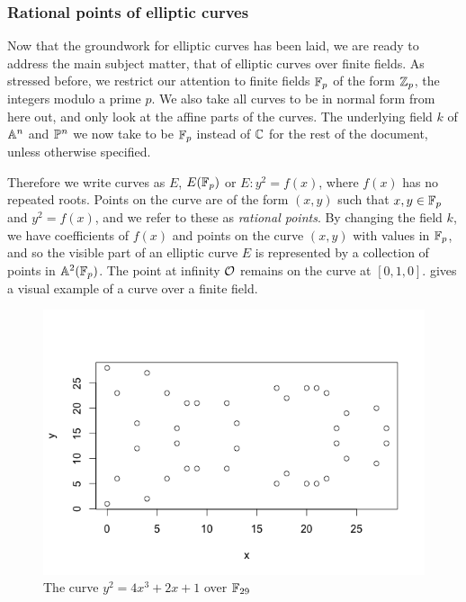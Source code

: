 \subsubsection{Rational points of elliptic curves}
Now that the groundwork for elliptic curves has been laid, we are ready to address the main subject matter, that of elliptic curves over finite fields.
As stressed before, we restrict our attention to finite fields $\fp$ of the form $\zn[p]$, the integers modulo a prime $p$.
We also take all curves to be in normal form from here out, and only look at the affine parts of the curves.
The underlying field $k$ of $\an$ and $\pn$ we now take to be $\fp$ instead of $\C$ for the rest of the document, unless otherwise specified.

Therefore we write curves as $E$, $E(\fp)$ or $E:y^2=f(x)$, where $f(x)$ has no repeated roots.
Points on the curve are of the form $(x,y)$ such that $x,y\in \fp$ and $y^2 = f(x)$, and we refer to these as \emph{rational points}.
By changing the field $k$, we have coefficients of $f(x)$ and points on the curve $(x,y)$ with values in $\fp$, and so the visible part of an elliptic curve $E$ is represented by a collection of points in $\an[2](\fp)$.
The point at infinity $\pai$ remains on the curve at $[0,1,0]$.
 gives a visual example of a curve over a finite field.
\begin{figure}[htbp]
	\centering
	\includegraphics[scale=0.5]{../Figures/finiteellipticcurve.png}
	\caption{The curve $y^2 = 4x^3 + 2x + 1$ over $\fp[29]$}
	\label{finitecurve}
% 
% 
% 
% 
\end{figure}

